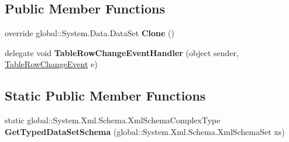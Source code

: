 \subsection*{Public Member Functions}
\begin{DoxyCompactItemize}
\item 
\mbox{\label{classprojekt__grupowy_1_1database_data_set1_a18da6f77db71fac50fdeb88cd9847234}} 
override global\+::\+System.\+Data.\+Data\+Set {\bfseries Clone} ()
\item 
\mbox{\label{classprojekt__grupowy_1_1database_data_set1_a10d76c3b643a3179cf094e6c4db20d66}} 
delegate void {\bfseries Table\+Row\+Change\+Event\+Handler} (object sender, \hyperlink{classprojekt__grupowy_1_1database_data_set1_1_1_table_row_change_event}{Table\+Row\+Change\+Event} e)
\end{DoxyCompactItemize}
\subsection*{Static Public Member Functions}
\begin{DoxyCompactItemize}
\item 
\mbox{\label{classprojekt__grupowy_1_1database_data_set1_abbc24ce53c73787e18955674655a00e9}} 
static global\+::\+System.\+Xml.\+Schema.\+Xml\+Schema\+Complex\+Type {\bfseries Get\+Typed\+Data\+Set\+Schema} (global\+::\+System.\+Xml.\+Schema.\+Xml\+Schema\+Set xs)
\end{DoxyCompactItemize}
